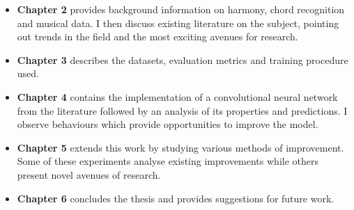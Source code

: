 \begin{itemize}
    \item \textbf{Chapter 2} provides background information on harmony, chord recognition and musical data. I then discuss existing literature on the subject, pointing out trends in the field and the most exciting avenues for research.
    \item \textbf{Chapter 3} describes the datasets, evaluation metrics and training procedure used.
    \item \textbf{Chapter 4} contains the implementation of a convolutional neural network from the literature followed by an analysis of its properties and predictions. I observe behaviours which provide opportunities to improve the model. 
    \item \textbf{Chapter 5} extends this work by studying various methods of improvement. Some of these experiments analyse existing improvements while others present novel avenues of research.
    \item \textbf{Chapter 6} concludes the thesis and provides suggestions for future work.
\end{itemize}